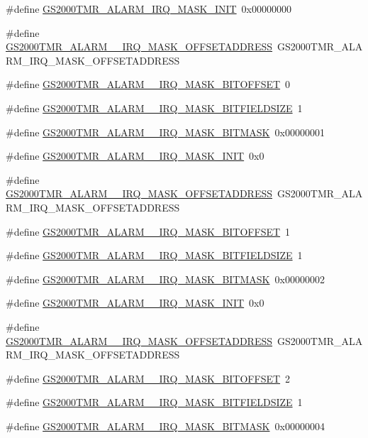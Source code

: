 \begin{DoxyCompactItemize}
\item 
\#define \hyperlink{a00556_a787c219c8ff342058af3ddd8db27baca}{GS2000TMR\_\-ALARM\_\-IRQ\_\-MASK\_\-INIT}~0x00000000
\item 
\#define \hyperlink{a00556_a14f9198aeecadf3444dd0bbcabf41fcc}{GS2000TMR\_\-ALARM\_\_\-IRQ\_\-MASK\_\-OFFSETADDRESS}~GS2000TMR\_\-ALARM\_\-IRQ\_\-MASK\_\-OFFSETADDRESS
\item 
\#define \hyperlink{a00556_afc10ed5bae0bb58ec6b40906e15c7591}{GS2000TMR\_\-ALARM\_\_\-IRQ\_\-MASK\_\-BITOFFSET}~0
\item 
\#define \hyperlink{a00556_a071be14308c85515330e7adcf955f19e}{GS2000TMR\_\-ALARM\_\_\-IRQ\_\-MASK\_\-BITFIELDSIZE}~1
\item 
\#define \hyperlink{a00556_a9a7aa459bea17c101d8a942e00d33262}{GS2000TMR\_\-ALARM\_\_\-IRQ\_\-MASK\_\-BITMASK}~0x00000001
\item 
\#define \hyperlink{a00556_a7bac01f2a9b6a4b85792677429f9e26d}{GS2000TMR\_\-ALARM\_\_\-IRQ\_\-MASK\_\-INIT}~0x0
\item 
\#define \hyperlink{a00556_a992cc5e1170b841cc27db1cfb25b558f}{GS2000TMR\_\-ALARM\_\_\-IRQ\_\-MASK\_\-OFFSETADDRESS}~GS2000TMR\_\-ALARM\_\-IRQ\_\-MASK\_\-OFFSETADDRESS
\item 
\#define \hyperlink{a00556_aecf37bc2708621f94a761f54ee6ced2b}{GS2000TMR\_\-ALARM\_\_\-IRQ\_\-MASK\_\-BITOFFSET}~1
\item 
\#define \hyperlink{a00556_a33fd3b1053b2b90477e99e76c3d6b86d}{GS2000TMR\_\-ALARM\_\_\-IRQ\_\-MASK\_\-BITFIELDSIZE}~1
\item 
\#define \hyperlink{a00556_a752b2183a76ef13fc844c2f257367122}{GS2000TMR\_\-ALARM\_\_\-IRQ\_\-MASK\_\-BITMASK}~0x00000002
\item 
\#define \hyperlink{a00556_adfd10fa9b84efb3a64d98086ea7b6c3f}{GS2000TMR\_\-ALARM\_\_\-IRQ\_\-MASK\_\-INIT}~0x0
\item 
\#define \hyperlink{a00556_aeec9c0a1a36e114b227b23d009705564}{GS2000TMR\_\-ALARM\_\_\-IRQ\_\-MASK\_\-OFFSETADDRESS}~GS2000TMR\_\-ALARM\_\-IRQ\_\-MASK\_\-OFFSETADDRESS
\item 
\#define \hyperlink{a00556_a6c960e44e1fea5d67bb7873adf4b137c}{GS2000TMR\_\-ALARM\_\_\-IRQ\_\-MASK\_\-BITOFFSET}~2
\item 
\#define \hyperlink{a00556_aaf8ca2fd777134356f436c2b421fe9d6}{GS2000TMR\_\-ALARM\_\_\-IRQ\_\-MASK\_\-BITFIELDSIZE}~1
\item 
\#define \hyperlink{a00556_a22769b4b31b63e46eac93b4bf50e96af}{GS2000TMR\_\-ALARM\_\_\-IRQ\_\-MASK\_\-BITMASK}~0x00000004

\end{DoxyCompactItemize}
